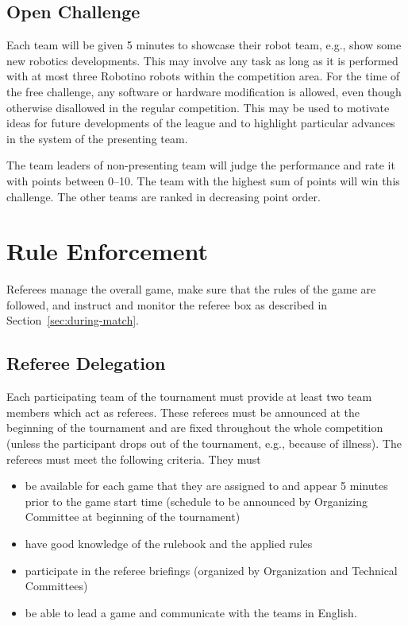 \documentclass[12pt,twoside]{article}
\newcommand{\refsec}[1]{Section~\ref{#1}}
\begin{document}
\subsection{Open Challenge~}
Each team will be given 5 minutes to showcase their robot team, e.g.,
show some new robotics developments. This may involve any task as long
as it is performed with at most three Robotino robots within the
competition area. For the time of the free challenge, any software or
hardware modification is allowed, even though otherwise disallowed in
the regular competition. This may be used to motivate ideas for future
developments of the league and to highlight particular advances in the
system of the presenting team.

The team leaders of non-presenting team will judge the performance and
rate it with points between 0--10.  The team with the highest sum of
points will win this challenge. The other teams are ranked in
decreasing point order.


\section{Rule Enforcement}
\label{sec:rule-enforcement}
Referees manage the overall game, make sure that the rules of the game
are followed, and instruct and monitor the referee box as described in
\refsec{sec:during-match}.

\subsection{Referee Delegation}
Each participating team of the tournament must provide at least two
team members which act as referees. These referees must be announced
at the beginning of the tournament and are fixed throughout the whole
competition (unless the participant drops out of the tournament,
e.g., because of illness). The referees must meet the following
criteria. They must

\begin{itemize}
\item be available for each game that they are assigned to and appear
  5 minutes prior to the game start time (schedule to be announced by
  Organizing Committee at beginning of the tournament)
\item have good knowledge of the rulebook and the applied rules
\item participate in the referee briefings (organized by Organization
  and Technical Committees)
\item be able to lead a game and communicate with the teams in
  English.
\end{itemize}
\end{document}
